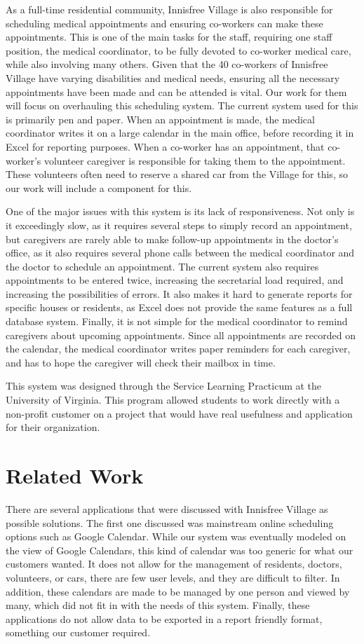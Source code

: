 \documentclass{sig-alternate}
\begin{document}
As a full-time residential community, Innisfree Village is also responsible for scheduling medical appointments and ensuring co-workers can make these appointments. This is one of the main tasks for the staff, requiring one staff position, the medical coordinator, to be fully devoted to co-worker medical care, while also involving many others. Given that the 40 co-workers of Innisfree Village have varying disabilities and medical needs, ensuring all the necessary appointments have been made and can be attended is vital. Our work for them will focus on overhauling this scheduling system. The current system used for this is primarily pen and paper. When an appointment is made, the medical coordinator writes it on a large calendar in the main office, before recording it in Excel for reporting purposes. When a co-worker has an appointment, that co-worker’s volunteer caregiver is responsible for taking them to the appointment. These volunteers often need to reserve a shared car from the Village for this, so our work will include a component for this.

One of the major issues with this system is its lack of responsiveness. Not only is it exceedingly slow, as it requires several steps to simply record an appointment, but caregivers are rarely able to make follow-up appointments in the doctor’s office, as it also requires several phone calls between the medical coordinator and the doctor to schedule an appointment. The current system also requires appointments to be entered twice, increasing the secretarial load required, and increasing the possibilities of errors. It also makes it hard to generate reports for specific houses or residents, as Excel does not provide the same features as a full database system. Finally, it is not simple for the medical coordinator to remind caregivers about upcoming appointments. Since all appointments are recorded on the calendar, the medical coordinator writes paper reminders for each caregiver, and has to hope the caregiver will check their mailbox in time.

This system was designed through the Service Learning Practicum at the University of Virginia.  This program allowed students to work directly with a non-profit customer on a project that would have real usefulness and application for their organization.  

\section{Related Work}
There are several applications that were discussed with Innisfree Village as possible solutions.  The first one discussed was mainstream online scheduling options such as Google Calendar. While our system was eventually modeled on the view of Google Calendars, this kind of calendar was too generic for what our customers wanted.  It does not allow for the management of residents, doctors, volunteers, or cars, there are few user levels, and they are difficult to filter.  In addition, these calendars are made to be managed by one person and viewed by many, which did not fit in with the needs of this system. Finally, these applications do not allow data to be exported in a report friendly format, something our customer required.
	
\end{document}
